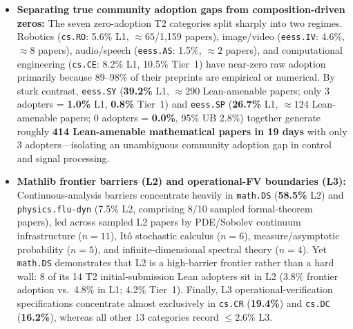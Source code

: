 \documentclass[11pt,letterpaper]{article}
\begin{document}
\begin{itemize}
  \item \textbf{Separating true community adoption gaps from composition-driven zeros:} The seven zero-adoption T2 categories split sharply into two regimes. Robotics (\texttt{cs.RO}: 5.6\% L1, $\approx 65$/1,159 papers), image/video (\texttt{eess.IV}: 4.6\%, $\approx 8$ papers), audio/speech (\texttt{eess.AS}: 1.5\%, $\approx 2$ papers), and computational engineering (\texttt{cs.CE}: 8.2\% L1, 10.5\% Tier~1) have near-zero raw adoption primarily because 89--98\% of their preprints are empirical or numerical. By stark contrast, \texttt{eess.SY} (\textbf{39.2\%} L1, $\approx 290$ Lean-amenable papers; only 3 adopters = \textbf{1.0\%} L1, \textbf{0.8\%} Tier~1) and \texttt{eess.SP} (\textbf{26.7\%} L1, $\approx 124$ Lean-amenable papers; 0 adopters = \textbf{0.0\%}, 95\% UB 2.8\%) together generate roughly \textbf{414 Lean-amenable mathematical papers in 19 days} with only 3 adopters---isolating an unambiguous community adoption gap in control and signal processing.
  \item \textbf{Mathlib frontier barriers (L2) and operational-FV boundaries (L3):} Continuous-analysis barriers concentrate heavily in \texttt{math.DS} (\textbf{58.5\%} L2) and \texttt{physics.flu-dyn} (7.5\% L2, comprising 8/10 sampled formal-theorem papers), led across sampled L2 papers by PDE/Sobolev continuum infrastructure ($n = 11$), It\^o stochastic calculus ($n = 6$), measure/asymptotic probability ($n = 5$), and infinite-dimensional spectral theory ($n = 4$). Yet \texttt{math.DS} demonstrates that L2 is a high-barrier frontier rather than a hard wall: 8 of its 14 T2 initial-submission Lean adopters sit in L2 (3.8\% frontier adoption vs.\ 4.8\% in L1; 4.2\% Tier~1). Finally, L3 operational-verification specifications concentrate almost exclusively in \texttt{cs.CR} (\textbf{19.4\%}) and \texttt{cs.DC} (\textbf{16.2\%}), whereas all other 13 categories record $\le 2.6\%$ L3.
\end{itemize}
\end{document}
